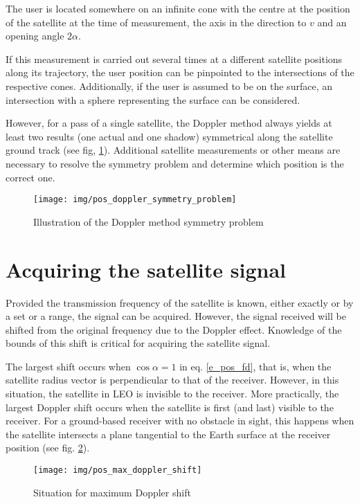 The user is located somewhere on an infinite cone with the centre at the position of the satellite at the time of measurement, the axis in the direction to $v$ and an opening angle $2\alpha$.

If this measurement is carried out several times at a different satellite positions along its trajectory, the user position can be pinpointed to the intersections of the respective cones. Additionally, if the user is assumed to be on the surface, an intersection with a sphere representing the surface can be considered.

However, for a pass of a single satellite, the Doppler method always yields at least two results (one actual and one shadow) symmetrical along the satellite ground track (see fig, \ref{f_pos_doppler_symmetry_problem}). Additional satellite measurements or other means are necessary to resolve the symmetry problem and determine which position is the correct one.

\begin{figure}
    \centering
    \texttt{[image: img/pos\_doppler\_symmetry\_problem]}
    \caption{Illustration of the Doppler method symmetry problem\cite{sop09}}
    \label{f_pos_doppler_symmetry_problem}
\end{figure}


\section{Acquiring the satellite signal}
Provided the transmission frequency of the satellite is known, either exactly or by a set or a range, the signal can be acquired. However, the signal received will be shifted from the original frequency due to the Doppler effect. Knowledge of the bounds of this shift is critical for acquiring the satellite signal.

The largest shift occurs when $\cos{\alpha} = 1$ in eq. \ref{e_pos_fd}, that is, when the satellite radius vector is perpendicular to that of the receiver. However, in this situation, the satellite in LEO is invisible to the receiver. More practically, the largest Doppler shift occurs when the satellite is first (and last) visible to the receiver. For a ground-based receiver with no obstacle in sight, this happens when the satellite intersects a plane tangential to the Earth surface at the receiver position (see fig. \ref{f_pos_max_doppler_shift}).

\begin{figure}
    \centering
    \texttt{[image: img/pos\_max\_doppler\_shift]}
    \caption{Situation for maximum Doppler shift}
    \label{f_pos_max_doppler_shift}
\end{figure}

